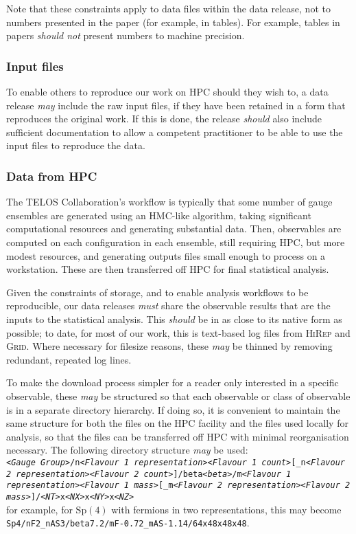 \documentclass{article}
\newcommand\rfcword[1]{\emph{#1}\xspace}
\newcommand\must{\rfcword{must}}
\newcommand\should{\rfcword{should}}
\newcommand\shouldnot{\rfcword{should not}}
\newcommand\may{\rfcword{may}}
\newcommand\program[1]{\textsc{#1}\xspace}
\begin{document}
Note that these constraints apply to data files within the data release,
not to numbers presented in the paper
(for example,
in tables).
For example,
tables in papers \shouldnot present numbers to machine precision.

\subsubsection{Input files}

To enable others to reproduce our work on HPC should they wish to,
a data release \may include the raw input files,
if they have been retained in a form that reproduces the original work.
If this is done,
the release \should also include sufficient documentation
to allow a competent practitioner to be able to use the input files to reproduce the data.

\subsubsection{Data from HPC}\label{sec:dr-from-hpc}

The TELOS Collaboration's workflow is typically that
some number of gauge ensembles are generated using an HMC-like algorithm,
taking significant computational resources
and generating substantial data.
Then,
observables are computed on each configuration in each ensemble,
still requiring HPC,
but more modest resources,
and generating outputs files small enough to process on a workstation.
These are then transferred off HPC for final statistical analysis.

Given the constraints of storage,
and to enable analysis workflows to be reproducible,
our data releases \must
share the observable results that are the inputs to the statistical analysis.
This \should be in as close to its native form as possible;
to date,
for most of our work,
this is text-based log files from \program{HiRep} and \program{Grid}.
Where necessary for filesize reasons,
these \may be thinned by removing redundant, repeated log lines.

To make the download process simpler for a reader only interested in a specific observable,
these \may be structured so that
each observable or class of observable
is in a separate directory hierarchy.
If doing so,
it is convenient to maintain the same structure for both
the files on the HPC facility
and the files used locally for analysis,
so that the files can be transferred off HPC with minimal reorganisation necessary.
The following directory structure \may be used:
\\
\texttt{\emph{<Gauge Group>}/n\emph{<Flavour 1 representation><Flavour 1 count>}[\_n\emph{<Flavour 2 representation><Flavour 2 count>}]/beta\emph{<beta>}/m\emph{<Flavour 1 representation><Flavour 1 mass>}[\_m\emph{<Flavour 2 representation><Flavour 2 mass>}]/\emph{<NT>}x\emph{<NX>}x\emph{<NY>}x\emph{<NZ>}}\\
for example,
for $\mathrm{Sp}(4)$ with fermions in two representations,
this may become\\
\texttt{Sp4/nF2\_nAS3/beta7.2/mF-0.72\_mAS-1.14/64x48x48x48}.
\end{document}
